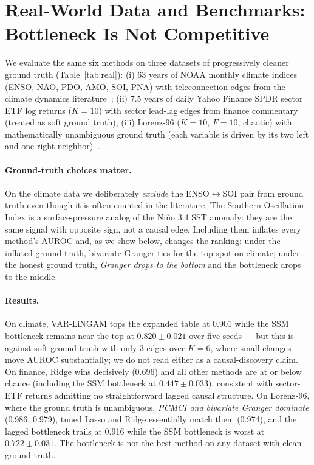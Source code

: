 \documentclass{article}
\begin{document}
\section{Real-World Data and Benchmarks: Bottleneck Is Not Competitive}
\label{sec:realdata}

We evaluate the same six methods on three datasets of progressively
cleaner ground truth (Table~\ref{tab:real}):
(i) 63 years of NOAA monthly climate indices
(ENSO, NAO, PDO, AMO, SOI, PNA) with teleconnection edges from the
climate dynamics literature~\citep{trenberth1994decadal,delworth2000observed,newman2016pdo};
(ii) 7.5 years of daily Yahoo Finance SPDR sector ETF log returns
($K{=}10$) with sector lead-lag edges from finance commentary (treated
as soft ground truth);
(iii) Lorenz-96 ($K{=}10$, $F{=}10$, chaotic) with mathematically
unambiguous ground truth (each variable is driven by its two left
and one right neighbor)~\citep{tank2021neural,nauta2019causal}.

\paragraph{Ground-truth choices matter.} On the climate data we
deliberately \emph{exclude} the ENSO$\leftrightarrow$SOI pair from
ground truth even though it is often counted in the literature. The
Southern Oscillation Index is a surface-pressure analog of the Niño
3.4 SST anomaly: they are the same signal with opposite sign, not a
causal edge. Including them inflates every method's AUROC and, as we
show below, changes the ranking: under the inflated ground truth,
bivariate Granger ties for the top spot on climate; under the
honest ground truth, \emph{Granger drops to the bottom} and the
bottleneck drops to the middle.

\paragraph{Results.} On climate, VAR-LiNGAM tops the expanded table
at $0.901$ while the SSM bottleneck remains near the top at
$0.820 \pm 0.021$ over five seeds — but this is against soft ground truth
with only 3 edges over $K{=}6$, where small changes move AUROC
substantially; we do not read either as a causal-discovery claim. On
finance, Ridge wins decisively (0.696) and all other methods are at
or below chance (including the SSM bottleneck at $0.447 \pm 0.033$), consistent with
sector-ETF returns admitting no straightforward lagged causal
structure. On Lorenz-96, where the ground truth is unambiguous,
\emph{PCMCI and bivariate Granger dominate} (0.986, 0.979), tuned
Lasso and Ridge essentially match them (0.974), and the lagged
bottleneck trails at 0.916 while the SSM bottleneck is worst at
$0.722 \pm 0.031$. The bottleneck is not the best method on any dataset with
clean ground truth.
\end{document}
